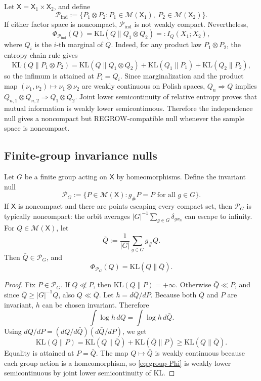 \documentclass[11pt]{article}
\newcommand{\KL}{\mathrm{KL}}
\newcommand{\Pcal}{\mathcal{P}}
\newcommand{\X}{\mathsf{X}}
\newcommand{\M}{\mathcal{M}}
\theoremstyle{definition}
\theoremstyle{definition}
\begin{document}
Let \(\X=\mathsf X_1\times\mathsf X_2\), and define
\[
  \Pcal_{\mathrm{ind}}
  :=\{P_1\otimes P_2:P_1\in\M(\mathsf X_1),\ P_2\in\M(\mathsf X_2)\}.
\]
If either factor space is noncompact, \(\Pcal_{\mathrm{ind}}\) is not weakly compact.  Nevertheless,
\begin{equation}\label{eq:independence-Phi}
  \Phi_{\Pcal_{\mathrm{ind}}}(Q)
  =\KL(Q\|Q_1\otimes Q_2)=:I_Q(X_1;X_2),
\end{equation}
where \(Q_i\) is the \(i\)-th marginal of \(Q\).  Indeed, for any product law \(P_1\otimes P_2\), the entropy chain rule gives
\[
  \KL(Q\|P_1\otimes P_2)
  =\KL(Q\|Q_1\otimes Q_2)+\KL(Q_1\|P_1)+\KL(Q_2\|P_2),
\]
so the infimum is attained at \(P_i=Q_i\).  Since marginalization and the product map \((\nu_1,\nu_2)\mapsto \nu_1\otimes\nu_2\) are weakly continuous on Polish spaces, \(Q_n\Rightarrow Q\) implies \(Q_{n,1}\otimes Q_{n,2}\Rightarrow Q_1\otimes Q_2\).  Joint lower semicontinuity of relative entropy proves that mutual information is weakly lower semicontinuous.  Therefore the independence null gives a noncompact but REGROW-compatible null whenever the sample space is noncompact.

\subsection{Finite-group invariance nulls}

Let \(G\) be a finite group acting on \(\X\) by homeomorphisms.  Define the invariant null
\[
  \Pcal_G:=\{P\in\M(\X):g_\#P=P\text{ for all }g\in G\}.
\]
If \(\X\) is noncompact and there are points escaping every compact set, then \(\Pcal_G\) is typically noncompact: the orbit averages \(|G|^{-1}\sum_{g\in G}\delta_{g x_n}\) can escape to infinity.  For \(Q\in\M(\X)\), let
\[
  \bar Q:=\frac1{|G|}\sum_{g\in G} g_\#Q.
\]
Then \(\bar Q\in\Pcal_G\), and
\begin{equation}\label{eq:group-Phi}
  \Phi_{\Pcal_G}(Q)=\KL(Q\|\bar Q).
\end{equation}

\begin{proof}
Fix \(P\in\Pcal_G\).  If \(Q\not\ll P\), then \(\KL(Q\|P)=+\infty\).  Otherwise \(\bar Q\ll P\), and since \(\bar Q\ge |G|^{-1}Q\), also \(Q\ll\bar Q\).  Let \(h=d\bar Q/dP\).  Because both \(\bar Q\) and \(P\) are invariant, \(h\) can be chosen invariant.  Therefore
\[
  \int \log h\,dQ=\int \log h\,d\bar Q.
\]
Using \(dQ/dP=(dQ/d\bar Q)(d\bar Q/dP)\), we get
\[
  \KL(Q\|P)
  =\KL(Q\|\bar Q)+\KL(\bar Q\|P)
  \ge \KL(Q\|\bar Q).
\]
Equality is attained at \(P=\bar Q\).  The map \(Q\mapsto\bar Q\) is weakly continuous because each group action is a homeomorphism, so \eqref{eq:group-Phi} is weakly lower semicontinuous by joint lower semicontinuity of KL.
\end{proof}
\end{document}

